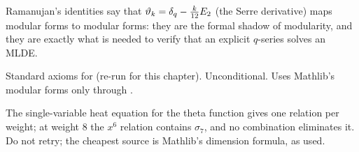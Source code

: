 \begin{physics}
Ramanujan's identities say that $\vartheta_k=\delta_q-\frac k{12}E_2$ (the Serre derivative) maps modular forms to modular
forms: they are the formal shadow of modularity, and they are exactly what is needed to verify that an explicit
$q$-series solves an MLDE.
\end{physics}
\begin{status}
Standard axioms for  (re-run for this chapter). Unconditional. Uses Mathlib's modular forms
only through .
\end{status}

\begin{warning}[title={Dead end: the heat equation alone does not give $E_4^2=E_8$}]
The single-variable heat equation for the theta function gives one relation per weight; at weight 8 the $x^6$
relation contains $\sigma_7$, and no combination eliminates it. Do not retry; the cheapest source is Mathlib's
dimension formula, as used.
\end{warning}

